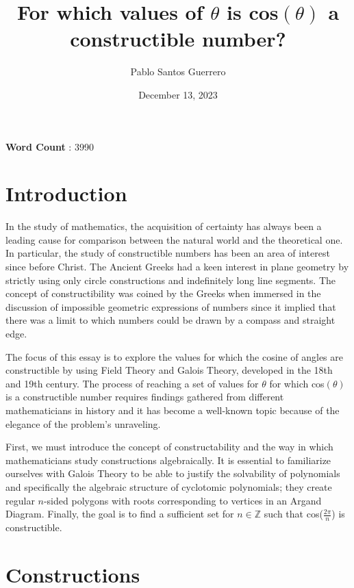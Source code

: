 \documentclass{article}
\author{Pablo Santos Guerrero}
\date{December 13, 2023}
\title{For which values of $\theta$ is cos$(\theta)$ a constructible number? }
\begin{document}
\maketitle
\begin{center}
\textbf{Word Count} : 3990
\end{center}


\newpage
\tableofcontents
\newpage

\section{Introduction}
 In the study of mathematics, the acquisition of certainty has always been a leading cause for comparison between the natural world and the theoretical one. 
In particular, the study of constructible numbers has been an area of interest since before Christ. The Ancient Greeks had a keen interest in plane geometry by strictly using only circle constructions and indefinitely long line segments.
The concept of constructibility was coined by the Greeks when immersed in the discussion of impossible geometric expressions of numbers since it implied that there was a limit to which numbers could be drawn by a compass and straight edge.
\par
The focus of this essay is to explore the values for which the cosine of angles are constructible by using Field Theory and Galois Theory, developed in the 18th 
and  19th century. The process of reaching a set of values for $\theta$ for which cos$(\theta)$ is a constructible number requires findings gathered from different mathematicians in history and it has become a well-known topic because of the elegance of the problem's unraveling. 
\par
First, we must introduce the concept of constructability and the way in which mathematicians study constructions algebraically. It is essential to familiarize ourselves with Galois Theory to be able to justify the solvability of polynomials and specifically the algebraic structure of cyclotomic polynomials; they create regular $n$-sided polygons with roots corresponding to vertices in an Argand Diagram. Finally, the goal is to find a sufficient set for $n\in\mathbb{Z}$ such that cos($\frac{2\pi}{n}$) is constructible.

\section{Constructions}
\par 
\end{document}

